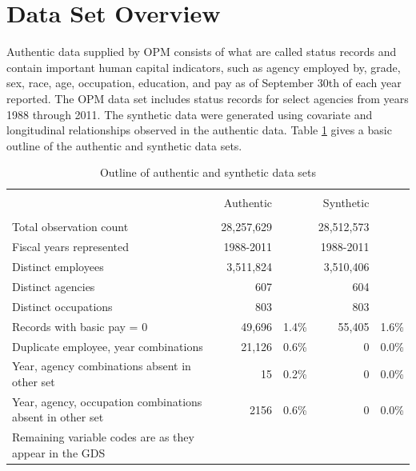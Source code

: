 \documentclass[10pt, letterpaper]{article}
\begin{document}
\begin{spacing}{1.0}
\renewcommand\cfttoctitlefont{\large}
\renewcommand\cftsecfont{\normalsize}
\renewcommand\cftsecpagefont{\normalsize}
\renewcommand\cftsubsecfont{\normalsize}
\renewcommand\cftsubsecpagefont{\normalsize}
\renewcommand{\cftsecleader}{\cftdotfill{\cftdotsep}}
\renewcommand*\contentsname{List of Sections}
\begin{center}
    \begin{minipage}{5.5in}
        \tableofcontents
    \end{minipage}
\end{center}

\clearpage

\section{Data Set Overview}

Authentic data supplied by OPM consists of what are called status records and contain important human capital indicators, such as agency employed by, grade, sex, race, age, occupation, education, and pay as of September 30th of each year reported.  The OPM data set includes status records for select agencies from years 1988 through 2011.  The synthetic data were generated using covariate and longitudinal relationships observed in the authentic data.  Table \ref{table:DataSetReview} gives a basic outline of the authentic and synthetic data sets.\\

\begin{table}[h]
    \centering
    \caption{Outline of authentic and synthetic data sets}
    \label{table:DataSetReview}
    \begin{tabular}{lrrrr}
        \hline\\[-10pt]
        & Authentic & & Synthetic & \\
        \hline\\[-6pt]
        Total observation count & 28,257,629 & & 28,512,573 & \\
        Fiscal years represented & 1988-2011 & & 1988-2011 & \\
        Distinct employees & 3,511,824 & & 3,510,406 & \\
        Distinct agencies & 607 & & 604 & \\
        Distinct occupations & 803 & & 803 & \\
        Records with basic pay = 0 &  49,696 & 1.4\% & 55,405 & 1.6\% \\
        Duplicate employee, year combinations & 21,126 & 0.6\% & 0 & 0.0\% \\
        Year, agency combinations absent in other set & 15 & 0.2\% & 0 & 0.0\% \\
        Year, agency, occupation combinations absent in other set & 2156 & 0.6\% & 0 & 0.0\% \\
        Remaining variable codes are as they appear in the GDS & & & & \\[4pt]
        \hline
    \end{tabular}
\end{table}


\end{spacing}
\end{document}
